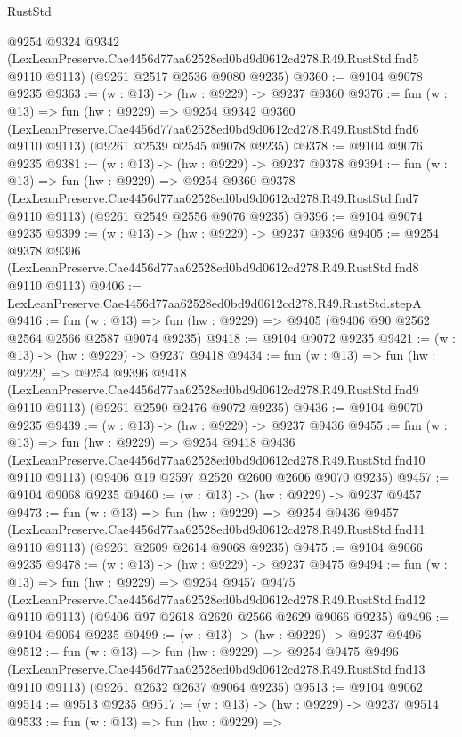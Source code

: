 \begin{lexlean}{RustStd}
\begin{coremodule}
  @9254
    @9324
    @9342
    (LexLeanPreserve.Cae4456d77aa62528ed0bd9d0612cd278.R49.RustStd.fnd5 @9110 @9113)
    (@9261 @2517 @2536 @9080 @9235)
@9360 := @9104 @9078 @9235
@9363 := (w : @13) -> (hw : @9229) -> @9237 @9360
@9376 := fun (w : @13) =>
  fun (hw : @9229) =>
  @9254
    @9342
    @9360
    (LexLeanPreserve.Cae4456d77aa62528ed0bd9d0612cd278.R49.RustStd.fnd6 @9110 @9113)
    (@9261 @2539 @2545 @9078 @9235)
@9378 := @9104 @9076 @9235
@9381 := (w : @13) -> (hw : @9229) -> @9237 @9378
@9394 := fun (w : @13) =>
  fun (hw : @9229) =>
  @9254
    @9360
    @9378
    (LexLeanPreserve.Cae4456d77aa62528ed0bd9d0612cd278.R49.RustStd.fnd7 @9110 @9113)
    (@9261 @2549 @2556 @9076 @9235)
@9396 := @9104 @9074 @9235
@9399 := (w : @13) -> (hw : @9229) -> @9237 @9396
@9405 := @9254
    @9378
    @9396
    (LexLeanPreserve.Cae4456d77aa62528ed0bd9d0612cd278.R49.RustStd.fnd8 @9110 @9113)
@9406 := LexLeanPreserve.Cae4456d77aa62528ed0bd9d0612cd278.R49.RustStd.stepA
@9416 := fun (w : @13) => fun (hw : @9229) => @9405 (@9406 @90 @2562 @2564 @2566 @2587 @9074 @9235)
@9418 := @9104 @9072 @9235
@9421 := (w : @13) -> (hw : @9229) -> @9237 @9418
@9434 := fun (w : @13) =>
  fun (hw : @9229) =>
  @9254
    @9396
    @9418
    (LexLeanPreserve.Cae4456d77aa62528ed0bd9d0612cd278.R49.RustStd.fnd9 @9110 @9113)
    (@9261 @2590 @2476 @9072 @9235)
@9436 := @9104 @9070 @9235
@9439 := (w : @13) -> (hw : @9229) -> @9237 @9436
@9455 := fun (w : @13) =>
  fun (hw : @9229) =>
  @9254
    @9418
    @9436
    (LexLeanPreserve.Cae4456d77aa62528ed0bd9d0612cd278.R49.RustStd.fnd10 @9110 @9113)
    (@9406 @19 @2597 @2520 @2600 @2606 @9070 @9235)
@9457 := @9104 @9068 @9235
@9460 := (w : @13) -> (hw : @9229) -> @9237 @9457
@9473 := fun (w : @13) =>
  fun (hw : @9229) =>
  @9254
    @9436
    @9457
    (LexLeanPreserve.Cae4456d77aa62528ed0bd9d0612cd278.R49.RustStd.fnd11 @9110 @9113)
    (@9261 @2609 @2614 @9068 @9235)
@9475 := @9104 @9066 @9235
@9478 := (w : @13) -> (hw : @9229) -> @9237 @9475
@9494 := fun (w : @13) =>
  fun (hw : @9229) =>
  @9254
    @9457
    @9475
    (LexLeanPreserve.Cae4456d77aa62528ed0bd9d0612cd278.R49.RustStd.fnd12 @9110 @9113)
    (@9406 @97 @2618 @2620 @2566 @2629 @9066 @9235)
@9496 := @9104 @9064 @9235
@9499 := (w : @13) -> (hw : @9229) -> @9237 @9496
@9512 := fun (w : @13) =>
  fun (hw : @9229) =>
  @9254
    @9475
    @9496
    (LexLeanPreserve.Cae4456d77aa62528ed0bd9d0612cd278.R49.RustStd.fnd13 @9110 @9113)
    (@9261 @2632 @2637 @9064 @9235)
@9513 := @9104 @9062
@9514 := @9513 @9235
@9517 := (w : @13) -> (hw : @9229) -> @9237 @9514
@9533 := fun (w : @13) =>
  fun (hw : @9229) =>

\end{coremodule}
\end{lexlean}
